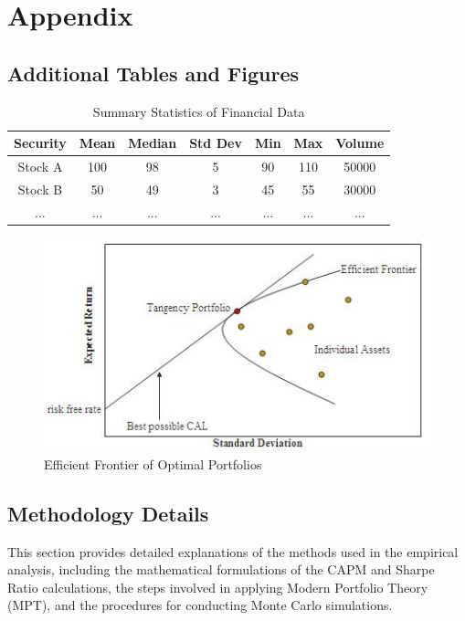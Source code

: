 \section*{Appendix}

\subsection*{Additional Tables and Figures}
\begin{table}[h!]
    \centering
    \caption{Summary Statistics of Financial Data}
    \begin{tabular}{|c|c|c|c|c|c|c|}
        \hline
        Security & Mean & Median & Std Dev & Min & Max & Volume \\
        \hline
        Stock A & 100 & 98 & 5 & 90 & 110 & 50000 \\
        Stock B & 50 & 49 & 3 & 45 & 55 & 30000 \\
        ... & ... & ... & ... & ... & ... & ... \\
        \hline
    \end{tabular}
\end{table}

\begin{figure}[h!]
    \centering
    \includegraphics[width=\textwidth]{efficient_frontier.png}
    \caption{Efficient Frontier of Optimal Portfolios}
    \label{fig:efficient_frontier}
\end{figure}

\subsection*{Methodology Details}
This section provides detailed explanations of the methods used in the empirical analysis, including the mathematical formulations of the CAPM and Sharpe Ratio calculations, the steps involved in applying Modern Portfolio Theory (MPT), and the procedures for conducting Monte Carlo simulations.

